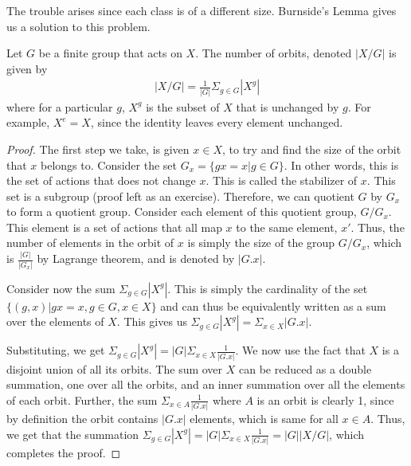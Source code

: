 The trouble arises since each class is of a different size.
Burnside's Lemma gives us a solution to this problem.
\begin{lemma} \label{lem:burnside}
  Let $G$ be a finite group that acts on $X$.
  The number of orbits, denoted $|X \big/ G|$ is given by
  \begin{align*}
    |X \big/ G| = \frac{1}{|G|} \Sigma_{g \in G} |X^{g}|
  \end{align*}
  where for a particular $g$, $X^{g}$ is the subset of $X$ that is unchanged by $g$.
  For example, $X^{e} = X$, since the identity leaves every element unchanged.
\end{lemma}
\begin{proof}
  The first step we take, is given $x \in X$, to try and find the size of the orbit that $x$ belongs to.
  Consider the set $G_{x} = \{ gx = x | g \in G \}$.
  In other words, this is the set of actions that does not change $x$.
  This is called the stabilizer of $x$.
  This set is a subgroup (proof left as an exercise).
  Therefore, we can quotient $G$ by $G_{x}$ to form a quotient group.
  Consider each element of this quotient group, $G \big/ G_{x}$.
  This element is a set of actions that all map $x$ to the same element, $x'$.
  Thus, the number of elements in the orbit of $x$ is simply the size of the group $G \big/ G_{x}$, which is $\frac{|G|}{|G_{x}|}$ by Lagrange theorem, and is denoted by $|G.x|$.
  \par
  Consider now the sum $\Sigma_{g \in G} |X^{g}|$. This is simply the cardinality of the set $ \{ (g, x) | gx = x, g \in G, x \in X \}$ and can thus be equivalently written as a sum over the elements of $X$.
  This gives us $\Sigma_{g \in G} |X^{g}| = \Sigma_{x \in X} |G.x|$.
  \par
  Substituting, we get $\Sigma_{g \in G} |X^{g}| = |G| \Sigma_{x \in X} \frac{1}{|G.x|}$.
  We now use the fact that $X$ is a disjoint union of all its orbits.
  The sum over $X$ can be reduced as a double summation, one over all the orbits, and an inner summation over all the elements of each orbit.
  Further, the sum $\Sigma_{x \in A} \frac{1}{|G.x|}$ where $A$ is an orbit is clearly 1, since by definition the orbit contains $|G.x|$ elements, which is same for all $x \in A$.
  Thus, we get that the summation $\Sigma_{g \in G} |X^{g}| = |G| \Sigma_{x \in X} \frac{1}{|G.x|} = |G| | X \big/ G|$, which completes the proof.
\end{proof}

